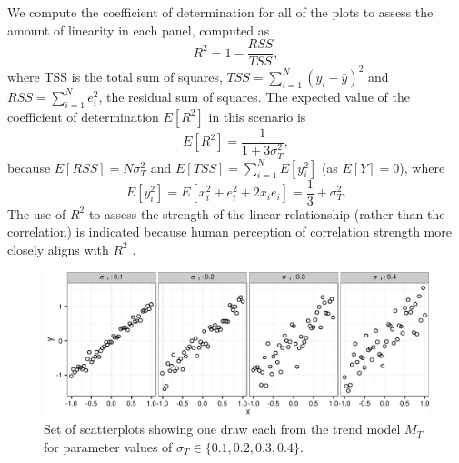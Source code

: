 \documentclass[11pt]{isuthesis}\usepackage[]{graphicx}\usepackage[]{color}
\newenvironment{knitrout}{}{} %
\begin{document}
We compute the coefficient of determination for all of the plots to assess the amount of linearity in each panel, computed as 
\begin{equation}\label{eq:linearMeasure}
R^2 = 1 - \frac{RSS}{TSS},
\end{equation}
where TSS is the total sum of squares, $TSS = \sum_{i=1}^N \left(y_i - \bar{y}\right)^2$ and $RSS = \sum_{i=1}^N e_i^2$, the residual sum of squares.
The expected value of the coefficient of determination $E\left[R^2\right]$ in this scenario is 
\[
E\left[R^2\right] =  \frac{1}{1 + 3\sigma^2_T},
\]
because
$E[RSS] = N\sigma^2_T$ and $E[TSS] = \sum_{i=1}^N E\left[y_i^2\right]$  (as $E[Y] = 0$), where 
$$
E\left[y_i^2\right] = E\left[x_i^2 + e_i^2 + 2 x_ie_i\right] = \frac{1}{3} + \sigma^2_T. 
$$
The use of $R^2$ to assess the strength of the linear relationship (rather than the correlation) is indicated because human perception of correlation strength more closely aligns with $R^2$ \citep{bobko1979perception,lewandowsky1989perception}. 

\begin{figure}[ht]
\begin{knitrout}
\color{fgcolor}

{\centering \includegraphics[width=\linewidth]{Figure/FeatureHierarchy/fig-trends-1} 

}



\end{knitrout}
\caption[Parameters affecting $M_T$]{\label{fig:trends} Set of scatterplots showing one draw each from the trend model $M_T$ for parameter values of  $\sigma_T \in \{0.1, 0.2, 0.3, 0.4\}$.}
\end{figure}
\end{document}
